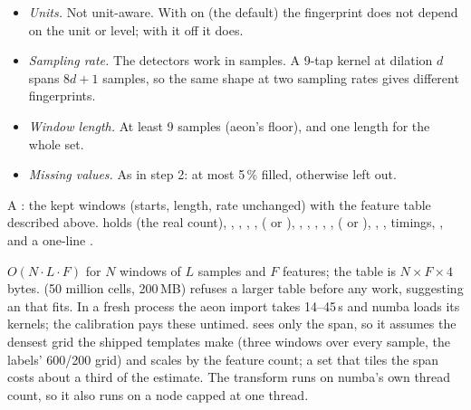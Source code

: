 \begin{itemize}
\item \emph{Units.} Not unit-aware. With  on (the default) the fingerprint
  does not depend on the unit or level; with it off it does.
\item \emph{Sampling rate.} The detectors work in samples. A 9-tap kernel at dilation $d$
  spans $8d+1$ samples, so the same shape at two sampling rates gives different
  fingerprints.
\item \emph{Window length.} At least 9 samples (aeon's floor), and one length for the whole
  set.
\item \emph{Missing values.} As in step 2: at most 5\,\% filled, otherwise left out.
\end{itemize}

A : the kept windows (starts, length, rate unchanged) with the feature table
described above.  holds  (the real count),
, , , ,
 ( or ), , ,
, , ,  ( or
), , , timings, ,
 and a one-line .

$O(N \cdot L \cdot F)$ for $N$ windows of $L$ samples and $F$ features; the table is
$N \times F \times 4$ bytes.  (50 million cells, 200\,MB) refuses a larger
table before any work, suggesting an  that fits. In a fresh process the
aeon import takes 14--45\,s and numba loads its kernels; the calibration pays these untimed.
 sees only the span, so it assumes the densest grid the shipped templates
make (three windows over every sample, the labels' 600/200 grid) and scales by the feature
count; a set that tiles the span costs about a third of the estimate. The transform runs on
numba's own thread count, so it also runs on a node capped at one thread.

